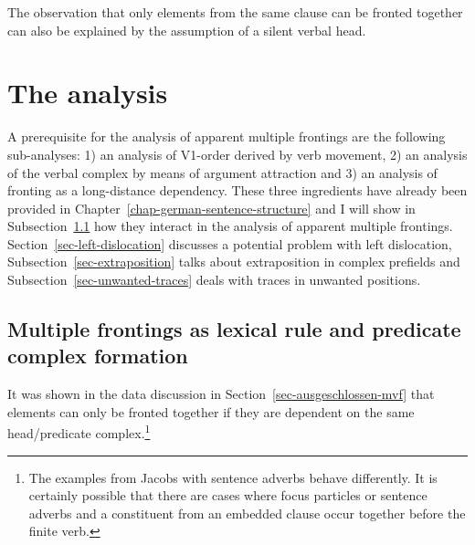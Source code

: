 The observation that only elements from the same clause can be fronted together can also be explained by the assumption of a silent
verbal head.
 





\section{The analysis}
\label{sec-analyse-mf}\label{sec-analyse-mf-vn}\label{sec-vn}

A prerequisite for the analysis of apparent multiple frontings are the following
sub-analyses: 1) an analysis of V1-order derived by verb movement, 2) an analysis of the verbal
complex by means of argument attraction and 3) an analysis of fronting as a long-distance dependency.
These three ingredients have already been provided in Chapter~\ref{chap-german-sentence-structure}
and I will show in Subsection~\ref{sec-mult-front-complex-formation} how they interact in the
analysis of apparent multiple frontings. Section~\ref{sec-left-dislocation} discusses a potential problem with left
dislocation, Subsection~\ref{sec-extraposition} talks about extraposition in complex prefields and Subsection~\ref{sec-unwanted-traces}
deals with traces in unwanted positions.

\subsection{Multiple frontings as lexical rule and predicate complex formation}
\label{sec-mult-front-complex-formation}

It was shown in the data discussion in Section~\ref{sec-ausgeschlossen-mvf} that elements can only be fronted together
if they are dependent on the same head/predicate complex.\footnote{
		The examples from Jacobs with sentence adverbs behave differently. It is certainly
		possible that there are cases where focus particles or sentence adverbs and a constituent
		from an embedded clause occur together before the finite verb.%
}
		
%



